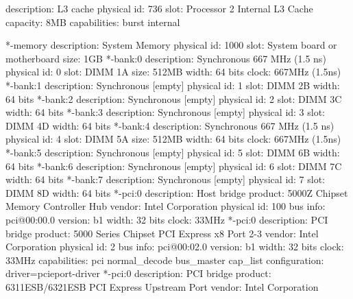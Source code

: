 \documentclass[mingoth,a4paper]{jsarticle}
\begin{document}
{{{{{{{{{{{{{{{{{{\begin{commandline}
             description: L3 cache
             physical id: 736
             slot: Processor 2 Internal L3 Cache
             capacity: 8MB
             capabilities: burst internal
\end{commandline}
\begin{commandline}
     *-memory
          description: System Memory
          physical id: 1000
          slot: System board or motherboard
          size: 1GB
        *-bank:0
             description: Synchronous 667 MHz (1.5 ns)
             physical id: 0
             slot: DIMM 1A
             size: 512MB
             width: 64 bits
             clock: 667MHz (1.5ns)
        *-bank:1
             description: Synchronous [empty]
             physical id: 1
             slot: DIMM 2B
             width: 64 bits
        *-bank:2
             description: Synchronous [empty]
             physical id: 2
             slot: DIMM 3C
             width: 64 bits
        *-bank:3
             description: Synchronous [empty]
             physical id: 3
             slot: DIMM 4D
             width: 64 bits
        *-bank:4
             description: Synchronous 667 MHz (1.5 ns)
             physical id: 4
             slot: DIMM 5A
             size: 512MB
             width: 64 bits
             clock: 667MHz (1.5ns)
        *-bank:5
             description: Synchronous [empty]
             physical id: 5
             slot: DIMM 6B
             width: 64 bits
        *-bank:6
             description: Synchronous [empty]
             physical id: 6
             slot: DIMM 7C
             width: 64 bits
        *-bank:7
             description: Synchronous [empty]
             physical id: 7
             slot: DIMM 8D
             width: 64 bits
     *-pci:0
          description: Host bridge
          product: 5000Z Chipset Memory Controller Hub
          vendor: Intel Corporation
          physical id: 100
          bus info: pci@00:00.0
          version: b1
          width: 32 bits
          clock: 33MHz
        *-pci:0
             description: PCI bridge
             product: 5000 Series Chipset PCI Express x8 Port 2-3
             vendor: Intel Corporation
             physical id: 2
             bus info: pci@00:02.0
             version: b1
             width: 32 bits
             clock: 33MHz
             capabilities: pci normal_decode bus_master cap_list
             configuration: driver=pcieport-driver
           *-pci:0
                description: PCI bridge
                product: 6311ESB/6321ESB PCI Express Upstream Port
                vendor: Intel Corporation

\end{commandline}}}}}}}}}}}}}}}}}}}
\end{document}
